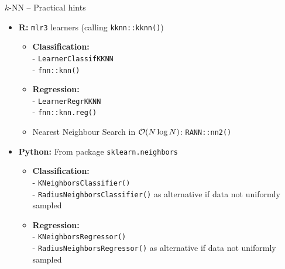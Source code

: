 \begin{frame}{$k$-NN -- Practical hints}

\begin{itemize}
  \item \textbf{R:} \texttt{mlr3} learners (calling \texttt{kknn::kknn()})
  \begin{itemize}
    \item \textbf{Classification:}\\ 
    - \texttt{LearnerClassifKKNN}\\
    - \texttt{fnn::knn()}
    \item \textbf{Regression:}\\
    - \texttt{LearnerRegrKKNN}\\
    - \texttt{fnn::knn.reg()}
    \item Nearest Neighbour Search in $\mathcal{O}(N \log N)$: \texttt{RANN::nn2()}
  \end{itemize}
  \item \textbf{Python:} From package \texttt{sklearn.neighbors} 
  \begin{itemize}
    \item \textbf{Classification:}\\ 
    - \texttt{KNeighborsClassifier()}\\
    - \texttt{RadiusNeighborsClassifier()} as alternative if data not uniformly sampled
    \item \textbf{Regression:}\\
    - \texttt{KNeighborsRegressor()} \\
    - \texttt{RadiusNeighborsRegressor()} as alternative if data not uniformly sampled
  \end{itemize}
\end{itemize}

\end{frame}

